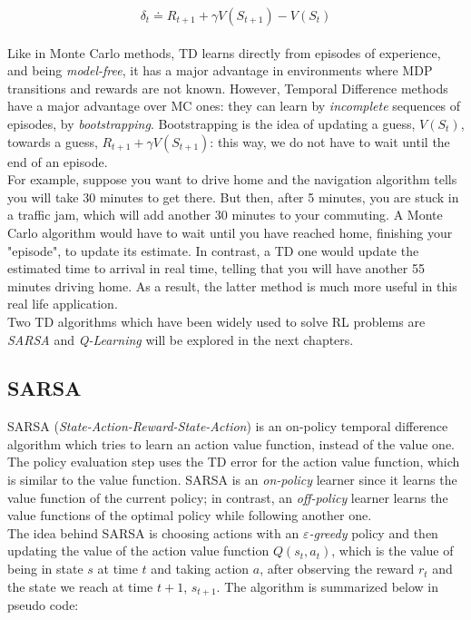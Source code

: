 \begin{equation}
	\delta _t \doteq R_{t+1} + \gamma V(S_{t+1}) - V(S_t)
\end{equation}
\\
\indent Like in Monte Carlo methods, TD learns directly from episodes of experience, and being \textit{model-free}, it has a major advantage in environments where MDP transitions and rewards are not known. However, Temporal Difference methods have a major advantage over MC ones: they can learn by \textit{incomplete} sequences of episodes, by \textit{bootstrapping}. Bootstrapping is the idea of updating a guess, $V(S_t)$, towards a guess,  $R_{t+1} + \gamma V(S_{t+1})$: this way, we do not have to wait until the end of an episode.
\\
\indent For example, suppose you want to drive home and the navigation algorithm tells you will take 30 minutes to get there. But then, after 5 minutes, you are stuck in a traffic jam, which will add another 30 minutes to your commuting. A Monte Carlo algorithm would have to wait until you have reached home, finishing your "episode", to update its estimate. In contrast, a TD one would update the estimated time to arrival in real time, telling that you will have another 55 minutes driving home. As a result, the latter method is much more useful in this real life application.
\\
\indent Two TD algorithms which have been widely used to solve RL problems are \textit{SARSA} and \textit{Q-Learning} will be explored in the next chapters.

\subsection{SARSA}

SARSA (\textit{State-Action-Reward-State-Action}) is an on-policy temporal difference algorithm which tries to learn an action value function, instead of the value one. The policy evaluation step uses the TD error for the action value function, which is similar to the value function. SARSA is an \textit{on-policy} learner since it learns the value function of the current policy; in contrast, an \textit{off-policy} learner learns the value functions of the optimal policy while following another one.
\\
\indent The idea behind SARSA is choosing actions with an \textit{$\varepsilon$-greedy} policy and then updating the value of the action value function $Q(s_t, a_t)$, which is the value of being in state $s$ at time $t$ and taking action $a$, after observing the reward $r_{t}$ and the state we reach at time $t+1$,  $s_{t+1}$. The algorithm is summarized below in pseudo code:

